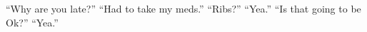 

\tt

``Why are you late?''  ``Had to take my meds.''  ``Ribs?''  ``Yea.''
``Is that going to be Ok?''  ``Yea.''

\bye

